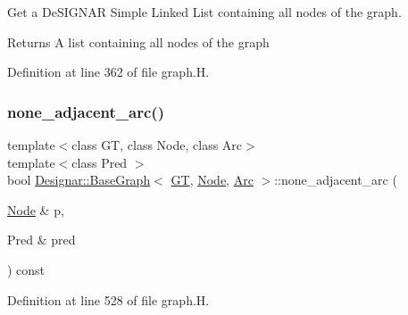 Get a De\+S\+I\+G\+N\+AR Simple Linked List containing all nodes of the graph. 

\begin{DoxyReturn}{Returns}
A list containing all nodes of the graph 
\end{DoxyReturn}


Definition at line 362 of file graph.\+H.

\mbox{\label{class_designar_1_1_base_graph_acf4b230e0d981f36770722011c96206f}} 
\subsubsection{\texorpdfstring{none\+\_\+adjacent\+\_\+arc()}{none\_adjacent\_arc()}\hspace{0.1cm}{\footnotesize\ttfamily [1/2]}}
{\footnotesize\ttfamily template$<$class GT, class Node, class Arc$>$ \\
template$<$class Pred $>$ \\
bool \hyperlink{class_designar_1_1_base_graph}{Designar\+::\+Base\+Graph}$<$ \hyperlink{demo-buildgraph_8_c_a3001c40d2c31ca87ed96cd7d1334a55e}{GT}, \hyperlink{namespace_designar_a5af326c65aa2bd26b26c410f2030d09e}{Node}, \hyperlink{namespace_designar_a3f55fb5513d62ff47cbc8f72b8e95d6f}{Arc} $>$\+::none\+\_\+adjacent\+\_\+arc (\begin{DoxyParamCaption}\item[{\hyperlink{namespace_designar_a5af326c65aa2bd26b26c410f2030d09e}{Node} \&}]{p,  }\item[{Pred \&}]{pred }\end{DoxyParamCaption}) const\hspace{0.3cm}{\ttfamily [inline]}}



Definition at line 528 of file graph.\+H.

\mbox{\label{class_designar_1_1_base_graph_adbacdf829cb2f21aff498bac9c9a8b8b}} 
